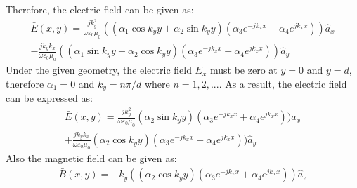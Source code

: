 \documentclass[11pt]{amsart}
\begin{document}
Therefore, the electric field can be given as:
\begin{equation}
\label{eq:7}
\begin{split}
\bar{E}(x,y)= \frac{j k_{y}^2}{\omega \varepsilon_0 \mu_0 }((\alpha_1 \cos k_y y +\alpha_2 \sin k_y y)(\alpha_3 e^{-j k_x x}+\alpha_4 e^{j k_x x}))\hat{a}_x
\\
- \frac{j k_{y}k_{x}}{\omega \varepsilon_0 \mu_0 }((\alpha_1 \sin k_y y -\alpha_2 \cos k_y y)(\alpha_3 e^{-j k_x x}-\alpha_4 e^{j k_x x}))\hat{a}_y
\end{split}
\end{equation}
Under the given geometry, the electric field $E_x$ must be zero at $y=0$ and $y=d$, therefore $\alpha_1=0$ and $k_y=n \pi/d$ where $n=1,2,...$. As a result, the electric field can be expressed as:
\begin{equation}
\label{eq:8}
\begin{split}
\bar{E}(x,y)= \frac{j k_{y}^2}{\omega \varepsilon_0 \mu_0 }(\alpha_2 \sin k_y y)(\alpha_3 e^{-j k_x x}+\alpha_4 e^{j k_x x}))\hat{a}_x
\\
+\frac{j k_{y}k_{x}}{\omega \varepsilon_0 \mu_0 }( \alpha_2 \cos k_y y)(\alpha_3 e^{-j k_x x}-\alpha_4 e^{j k_x x}))\hat{a}_y
\end{split}
\end{equation}
Also the  magnetic field can be given as:
\begin{equation}
\label{eq:9}
\begin{split}
\bar{B}(x,y)= -k_y((\alpha_2 \cos k_y y)(\alpha_3 e^{-j k_x x}+\alpha_4 e^{j k_x x}))\hat{a}_z
\end{split}
\end{equation}
\end{document}

